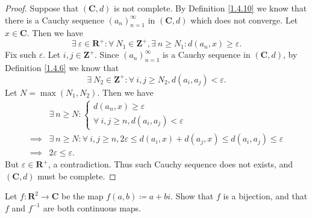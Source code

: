 \begin{proof}
    Suppose that \((\mathbf{C}, d)\) is not complete.
    By Definition \ref{1.4.10} we know that there is a Cauchy sequence \((a_n)_{n = 1}^\infty\) in \((\mathbf{C}, d)\) which does not converge.
    Let \(x \in \mathbf{C}\).
    Then we have
    \[
        \exists\ \varepsilon \in \mathbf{R}^+ : \forall\ N_1 \in \mathbf{Z}^+, \exists\ n \geq N_1 : d(a_n, x) \geq \varepsilon.
    \]
    Fix such \(\varepsilon\).
    Let \(i, j \in \mathbf{Z}^+\).
    Since \((a_n)_{n = 1}^\infty\) is a Cauchy sequence in \((\mathbf{C}, d)\), by Definition \ref{1.4.6} we know that
    \[
        \exists\ N_2 \in \mathbf{Z}^+ : \forall\ i, j \geq N_2, d(a_i, a_j) < \varepsilon.
    \]
    Let \(N = \max(N_1, N_2)\).
    Then we have
    \begin{align*}
                 & \exists\ n \geq N : \begin{cases}
            d(a_n, x) \geq \varepsilon \\
            \forall\ i, j \geq n, d(a_i, a_j) < \varepsilon
        \end{cases}                                                                     \\
        \implies & \exists\ n \geq N : \forall\ i, j \geq n, 2\varepsilon \leq d(a_i, x) + d(a_j, x) \leq d(a_i, a_j) \leq \varepsilon \\
        \implies & 2\varepsilon \leq \varepsilon.
    \end{align*}
    But \(\varepsilon \in \mathbf{R}^+\), a contradiction.
    Thus such Cauchy sequence does not exists, and \((\mathbf{C}, d)\) must be complete.
\end{proof}

\begin{exercise}\label{ex 4.6.11}
    Let \(f : \mathbf{R}^2 \to \mathbf{C}\) be the map \(f(a, b) \coloneqq a + bi\).
    Show that \(f\) is a bijection, and that \(f\) and \(f^{-1}\) are both continuous maps.
\end{exercise}

